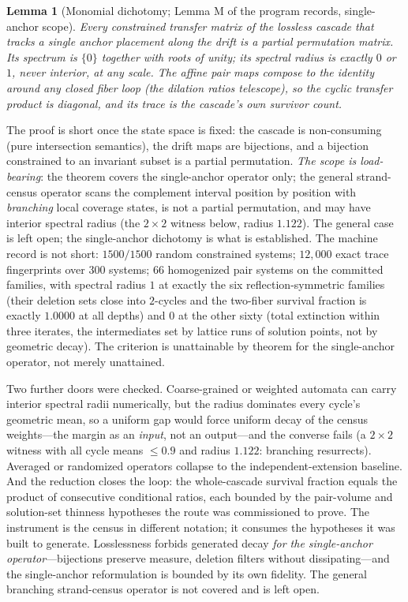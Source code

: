 \documentclass[11pt,a4paper]{article}
\numberwithin{equation}{section}
\theoremstyle{plain}
\newtheorem{lemma}[theorem]{Lemma}
\theoremstyle{definition}
\theoremstyle{remark}
\begin{document}
\begin{lemma}[Monomial dichotomy; Lemma M of the program records, single-anchor scope]
\label{lem:monomial}
Every constrained transfer matrix of the lossless cascade \emph{that
tracks a single anchor placement along the drift} is a partial
permutation matrix. Its spectrum is $\{0\}$ together with roots of unity;
its spectral radius is exactly $0$ or $1$, never interior, at any scale.
The affine pair maps compose to the identity
around any closed fiber loop (the dilation ratios telescope), so the
cyclic transfer product is diagonal, and its trace is the cascade's own
survivor count.
\end{lemma}

The proof is short once the state space is fixed: the cascade is
non-consuming (pure intersection semantics), the drift maps are
bijections, and a bijection constrained to an invariant subset is a
partial permutation. \emph{The scope is load-bearing}: the theorem
covers the single-anchor operator only; the general strand-census
operator scans the complement interval position by position with
\emph{branching} local coverage states, is not a partial permutation,
and may have interior spectral radius (the $2\times2$ witness below,
radius $1.122$). The general case is left open; the single-anchor
dichotomy is what is established. The machine record is not short:
$1500/1500$ random constrained systems; $12{,}000$ exact trace
fingerprints over $300$ systems; $66$ homogenized pair systems on the
committed families, with
spectral radius $1$ at exactly the six reflection-symmetric families
(their deletion sets close into $2$-cycles and the two-fiber survival
fraction is exactly $1.0000$ at all depths) and $0$ at the other sixty
(total extinction within three iterates, the intermediates set by lattice
runs of solution points, not by geometric decay). The criterion is
unattainable by theorem for the single-anchor operator, not merely
unattained.

Two further doors were checked. Coarse-grained or weighted automata can
carry interior spectral radii numerically, but the radius dominates every
cycle's geometric mean, so a uniform gap would force uniform decay of the
census weights---the margin as an \emph{input}, not an output---and the
converse fails (a $2\times2$ witness with all cycle means $\le0.9$ and
radius $1.122$: branching resurrects). Averaged or randomized operators
collapse to the independent-extension baseline. And the reduction closes
the loop: the whole-cascade survival fraction equals the product of
consecutive conditional ratios, each bounded by the pair-volume and
solution-set thinness hypotheses the route was commissioned to prove. The
instrument is the census in different notation; it consumes the
hypotheses it was built to generate. Losslessness forbids generated
decay \emph{for the single-anchor operator}---bijections preserve
measure, deletion filters without dissipating---and the single-anchor
reformulation is bounded by its own fidelity. The general branching
strand-census operator is not covered and is left open.
\end{document}
